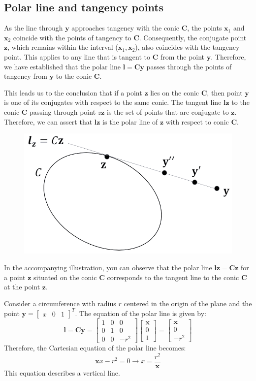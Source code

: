 \subsection{Polar line and tangency points}
As the line through $\mathbf{y}$ approaches tangency with the conic $\mathbf{C}$, the points $\mathbf{x}_1$ and $\mathbf{x}_2$ coincide with the points of tangency to $\mathbf{C}$. 
Consequently, the conjugate point $\mathbf{z}$, which remains within the interval ($\mathbf{x}_1,\mathbf{x}_2$), also coincides with the tangency point. 
This applies to any line that is tangent to $\mathbf{C}$ from the point $\mathbf{y}$.
Therefore, we have established that the polar line $\mathbf{l}=\mathbf{Cy}$ passes through the points of tangency from $\mathbf{y}$ to the conic $\mathbf{C}$. 

This leads us to the conclusion that if a point $\mathbf{z}$ lies on the conic $\mathbf{C}$, then point $\mathbf{y}$ is one of its conjugates with respect to the same conic. 
The tangent line $\mathbf{lz}$ to the conic $\mathbf{C}$ passing through point $z\mathbf{z}$ is the set of points that are conjugate to $\mathbf{z}$. 
Therefore, we can assert that $\mathbf{lz}$ is the polar line of $\mathbf{z}$ with respect to conic $\mathbf{C}$.
\begin{figure}[H]
    \centering
    \includegraphics[width=0.4\linewidth]{images/tangentpolar.png}
\end{figure}
In the accompanying illustration, you can observe that the polar line $\mathbf{lz} = \mathbf{Cz}$ for a point $\mathbf{z}$ situated on the conic $\mathbf{C}$ corresponds to the tangent line to the conic $\mathbf{C}$ at the point $\mathbf{z}$.
\begin{example}
    Consider a circumference with radius $r$ centered in the origin of the plane and the point $\mathbf{y}={\begin{bmatrix} x & 0 & 1 \end{bmatrix}}^T$. 
    The equation of the polar line is given by:
    \[\mathbf{l}=\mathbf{Cy}=\begin{bmatrix} 1 & 0 & 0 \\ 0 & 1 & 0 \\ 0 & 0 & -r^2 \end{bmatrix} \begin{bmatrix} \mathbf{x} \\ 0 \\ 1 \end{bmatrix} = \begin{bmatrix} \mathbf{x} \\ 0 \\ -r^2 \end{bmatrix}\]
    Therefore, the Cartesian equation of the polar line becomes: 
    \[\mathbf{x} x-r^2 = 0 \rightarrow x=\dfrac{r^2}{\mathbf{x}}\]
    This equation describes a vertical line.
\end{example}

